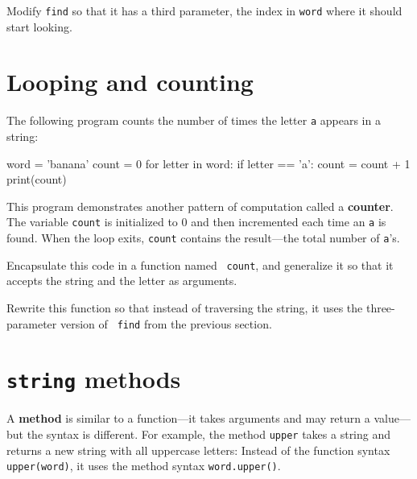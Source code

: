 
\begin{exercise}
Modify {\tt find} so that it has a
third parameter, the index in {\tt word} where it should start
looking.
\end{exercise}


\section{Looping and counting}
\label{counter}


The following program counts the number of times the letter {\tt a}
appears in a string:

\beforeverb
\begin{pycode}
word = 'banana'
count = 0
for letter in word:
    if letter == 'a':
        count = count + 1
print(count)
\end{pycode}
\afterverb
%
This program demonstrates another pattern of computation called a {\bf
counter}.  The variable {\tt count} is initialized to 0 and then
incremented each time an {\tt a} is found.
When the loop exits, {\tt count}
contains the result---the total number of {\tt a}'s.

\begin{exercise}

Encapsulate this code in a function named {\tt
count}, and generalize it so that it accepts the string and the
letter as arguments.
\end{exercise}

\begin{exercise}
Rewrite this function so that instead of
traversing the string, it uses the three-parameter version of {\tt
find} from the previous section.
\end{exercise}


\section{{\tt string} methods}

A {\bf method} is similar to a function---it takes arguments and
may return a value---but the syntax is different.  For example, the
method {\tt upper} takes a string and returns a new string with
all uppercase letters:
%
%
Instead of the function syntax {\tt upper(word)}, it uses
the method syntax {\tt word.upper()}.

